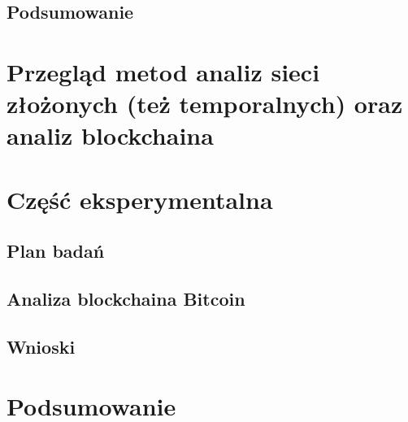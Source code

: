 \documentclass[12pt, twoside, final, openany]{mgr}
\begin{document}
\section{Podsumowanie}

\chapter{Przegląd metod analiz sieci złożonych (też temporalnych) oraz analiz blockchaina}

\chapter{Część eksperymentalna}
\section{Plan badań}
\section{Analiza blockchaina Bitcoin}
\section{Wnioski}


\chapter*{Podsumowanie}




\listoffigures
\listoftables
\end{document}
